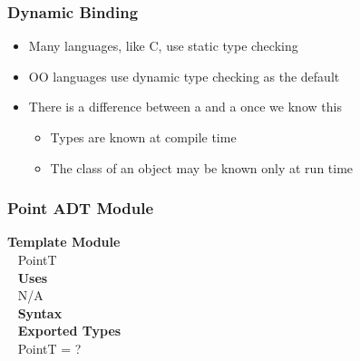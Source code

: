 \documentclass[t,12pt,numbers,fleqn]{beamer}
\begin{document}
\begin{frame}
\frametitle{Dynamic Binding}

\begin{itemize}
\item Many languages, like C, use static type checking
\item OO languages use dynamic type checking as the default
\item There is a difference between a  and a  once we know this
\begin{itemize}
\item Types are known at compile time
\item The class of an object may be known only at run time
\end{itemize}
\end{itemize}
\end{frame}


\begin{frame}
\frametitle{Point ADT Module}

\textbf{Template Module}\\
~\newline
PointT\\
~\newline
\textbf{Uses}\\
~\newline
N/A\\
~\newline
\textbf{Syntax}\\
~\newline
\textbf{Exported Types}\\
~\newline
PointT = ?\\

\end{frame}

\end{document}

